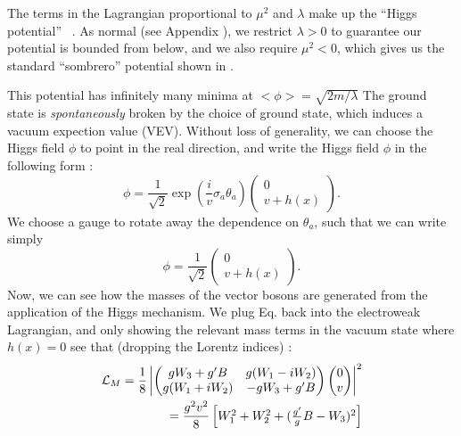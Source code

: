 The terms in the Lagrangian  proportional to $\mu^2$ and $\lambda$ make up the ``Higgs potential'' ~\cite{Higgs:1964pj}.
As normal (see Appendix ), we restrict $\lambda > 0$ to guarantee our potential is bounded from below, and we also require $\mu^2 < 0$, which gives us the standard ``sombrero'' potential shown in .

This potential has infinitely many minima at $<\phi> = \sqrt{2m/\lambda}$
The ground state is \textit{spontaneously} broken by the choice of ground state, which induces a vacuum expection value (VEV).
Without loss of generality, we can choose the Higgs field $\phi$ to point in the real direction, and write the Higgs field $\phi$ in the following form :
\begin{equation}
\phi = \frac{1}{\sqrt{2}} \exp( \frac{i}{v} \sigma_a \theta_a ) \begin{pmatrix} 0 \\ v + h(x) \end{pmatrix}.
\end{equation}
We choose a gauge to rotate away the dependence on $\theta_a$, such that we can write simply
\begin{equation}
\label{eq:higgs_field_after_ssb}
\phi = \frac{1}{\sqrt{2}} \begin{pmatrix} 0 \\ v + h(x) \end{pmatrix}.
\end{equation}
Now, we can see how the masses of the vector bosons are generated from the application of the Higgs mechanism.
We plug Eq. back into the electroweak Lagrangian, and only showing the relevant mass terms in the vacuum state where $h(x) = 0$  see that (dropping the Lorentz indices) :
\begin{align}
\mathcal{L}_M = \frac{1}{8} \begin{vmatrix} \begin{pmatrix} gW_3 + g'B & g(W_1 - iW_2)\\ g(W_1 + iW_2) & -gW_3 + g'B \end{pmatrix}  \begin{pmatrix} 0  \\ v \end{pmatrix} \end{vmatrix}^2\\ = \frac{g^2 v^2}{8} \begin{bmatrix} W_1^2 + W_2^2 + (\frac{g'}{g}B - W_3)^2 \end{bmatrix} \notag
\end{align}
